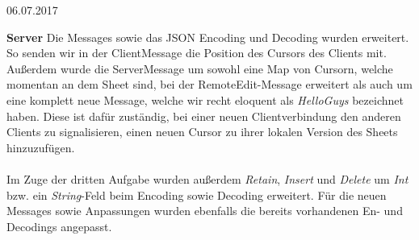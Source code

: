\documentclass{rp}
\begin{document}


{06.07.2017} %

%

\textbf{Server}
Die Messages sowie das JSON Encoding und Decoding wurden erweitert. So senden wir in der ClientMessage die Position des Cursors des Clients mit. Außerdem wurde die ServerMessage um sowohl eine Map von Cursorn, welche momentan an dem Sheet sind, bei der RemoteEdit-Message erweitert als auch um eine komplett neue Message, welche wir recht eloquent als \textit{HelloGuys} bezeichnet haben. Diese ist dafür zuständig, bei einer neuen Clientverbindung den anderen Clients zu signalisieren, einen neuen Cursor zu ihrer lokalen Version des Sheets hinzuzufügen.\\\\
Im Zuge der dritten Aufgabe wurden außerdem \textit{Retain}, \textit{Insert} und \textit{Delete} um \textit{Int} bzw. ein \textit{String}-Feld beim Encoding sowie Decoding erweitert. Für die neuen Messages sowie Anpassungen wurden ebenfalls die bereits vorhandenen En- und Decodings angepasst.
\end{document}
